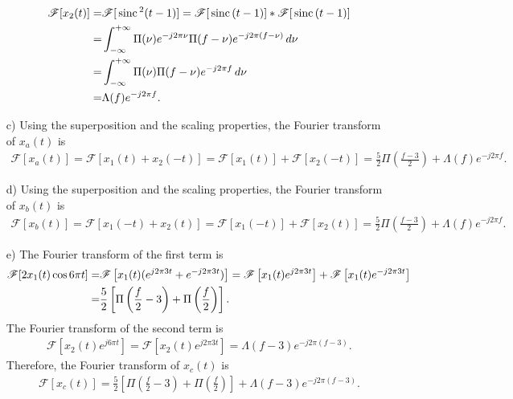 \documentclass{assignment}
\begin{document}
\begin{sol}
\begin{itemize}
\begin{align}
            \notag\mathscr{F}[x_2(t)]=&\mathscr{F}[\,\text{sinc}\,^2(t-1)]=\mathscr{F}[\,\text{sinc}\,(t-1)]*\mathscr{F}[\,\text{sinc}\,(t-1)]\\
            \notag=&\int_{-\infty}^{+\infty}\Pi(\nu)e^{-j2\pi\nu}\Pi(f-\nu)e^{-j2\pi(f-\nu)}\,d\nu\\
            \notag=&\int_{-\infty}^{+\infty}\Pi(\nu)\Pi(f-\nu)e^{-j2\pi f}\,d\nu\\
            =&\Lambda(f)e^{-j2\pi f}.
        \end{align}
        \item[c)] Using the superposition and the scaling properties, the Fourier transform of $x_a(t)$ is
        \begin{align}
            \mathscr{F}[x_a(t)]=\mathscr{F}[x_1(t)+x_2(-t)]=\mathscr{F}[x_1(t)]+\mathscr{F}[x_2(-t)]=\frac{5}{2}\Pi\left(\frac{f-3}{2}\right)+\Lambda(f)e^{-j2\pi f}.
        \end{align}
        \item[d)] Using the superposition and the scaling properties, the Fourier transform of $x_b(t)$ is
        \begin{align}
            \mathscr{F}[x_b(t)]=\mathscr{F}[x_1(-t)+x_2(t)]=\mathscr{F}[x_1(-t)]+\mathscr{F}[x_2(t)]=\frac{5}{2}\Pi\left(\frac{f-3}{2}\right)+\Lambda(f)e^{-j2\pi f}.
        \end{align}
        \item[e)] The Fourier transform of the first term is
        \begin{align}
            \notag\mathscr{F}[2x_1(t)\cos 6\pi t]=&\mathscr{F}\left[x_1(t)(e^{j2\pi 3t}+e^{-j2\pi 3t})\right]=\mathscr{F}\left[x_1(t)e^{j2\pi 3t}\right]+\mathscr{F}\left[x_1(t)e^{-j2\pi 3t}\right]\\
            =&\frac{5}{2}\left[\Pi\left(\frac{f}{2}-3\right)+\Pi\left(\frac{f}{2}\right)\right].
        \end{align}
        The Fourier transform of the second term is
        \begin{align}
            \mathscr{F}\left[x_2(t)e^{j6\pi t}\right]=\mathscr{F}\left[x_2(t)e^{j2\pi 3t}\right]=\Lambda(f-3)e^{-j2\pi(f-3)}.
        \end{align}
        Therefore, the Fourier transform of $x_c(t)$ is
        \begin{align}
            \mathscr{F}[x_c(t)]=\frac{5}{2}\left[\Pi\left(\frac{f}{2}-3\right)+\Pi\left(\frac{f}{2}\right)\right]+\Lambda(f-3)e^{-j2\pi(f-3)}.
        \end{align}
    \end{itemize}
\end{sol}
\end{document}

